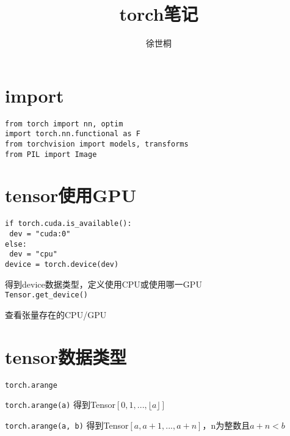 \documentclass[UTF8]{ctexart}
\title{torch笔记}
\author{徐世桐}
\date{}
\begin{document}
\maketitle

\section{import}
\noindent \texttt{from torch import nn, optim}\\
\texttt{import torch.nn.functional as F}\\
\texttt{from torchvision import models, transforms}\\
\texttt{from PIL import Image}

\section{tensor使用GPU}
\noindent \texttt{}
\texttt{if torch.cuda.is\_available():}\\
\texttt{  dev = "cuda:0"}\\
\texttt{else:}\\
\texttt{  dev = "cpu"}\\
\texttt{device = torch.device(dev)}

  得到device数据类型，定义使用CPU或使用哪一GPU\\
\texttt{Tensor.get\_device()}

  查看张量存在的CPU/GPU



\section{tensor数据类型}
\noindent \texttt{torch.arange}

  \texttt{torch.arange(a)} 得到Tensor$[0, 1, ..., \lfloor a \rfloor]$

  \texttt{torch.arange(a, b)} 得到Tensor$[a, a+1, ..., a+n]$，n为整数且$a+n < b$
\end{document}
